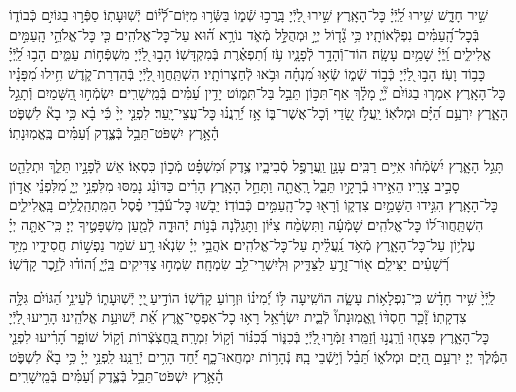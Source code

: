 \documentclass[twoside, openany, parskip=half, 11pt]{book}
\begin{document}
שִׁ֣יר חָדָ֑שׁ שִׁ֥ירוּ לַֽ֝יְֿיָ֗ כׇּל־הָאָֽרֶץ׃
שִׁ֣ירוּ לַ֭יְֿיָ בָּֽרֲכ֣וּ שְֿׁמ֑וֹ בַּשְּֿׂר֥וּ מִיּֽוֹם־לְֿ֝י֗וֹם יְֿשֽׁוּעָתֽוֹ׃
סַפְּֿר֣וּ בַגּוֹיִ֣ם כְּֿבוֹד֑וֹ בְּֿכׇל־הָֽ֝עַמִּ֗ים נִפְלְֿאוֹתָֽיו׃
כִּ֥י גָ֘ד֤וֹל יְיָ֣ וּמְהֻלָּ֣ל מְֿאֹ֑ד נוֹרָ֥א ה֝֗וּא עַל־כׇּל־אֱלֹהִֽים׃
כִּ֤י כׇּל־אֱלֹהֵ֣י הָֽעַמִּ֣ים אֱלִילִ֑ים וַֽ֝יְֿיָ֗ שָׁמַ֥יִם עָשָֽׂה׃
הוֹד־וְֿהָדָ֥ר לְֿפָנָ֑יו עֹ֥ז וְֿ֝תִפְאֶ֗רֶת בְּֿמִקְדָּשֽׁוֹ׃
הָב֣וּ לַ֭יְֿיָ מִשְׁפְּֿח֣וֹת עַמִּ֑ים הָב֥וּ לַֽ֝יְֿיָ֗ כָּב֥וֹד וָעֹֽז׃
הָב֣וּ לַ֭יְֿיָ כְּֿב֣וֹד שְֿׁמ֑וֹ שְֿׂא֥וּ מִ֝נְחָ֗ה וּבֹ֥אוּ לְֿחַצְרוֹתָֽיו׃
הִשְׁתַּֽחֲו֣וּ לַ֭יְֿיָ בְּֿהַדְרַת־קֹ֑דֶשׁ חִ֥ילוּ מִ֝פָּנָ֗יו כׇּל־הָאָֽרֶץ׃
אִמְר֤וּ בַגּוֹיִ֨ם יְ֘יָ֤ מָלָ֗ךְ אַף־תִּכּ֣וֹן תֵּבֵ֣ל בַּל־תִּמּ֑וֹט יָדִ֥ין עַ֝מִּ֗ים בְּֿמֵֽישָׁרִֽים׃
יִשְׂמְֿח֣וּ הַ֭שָּׁמַיִם וְֿתָגֵ֣ל הָאָ֑רֶץ יִרְעַ֥ם הַ֝יָּ֗ם וּמְלֹאֽוֹ׃
יַֽעֲלֹ֣ז שָׂ֭דַי וְֿכׇל־אֲשֶׁר־בּ֑וֹ אָ֥ז יְֿ֝רַֽנֲנ֗וּ כׇּל־עֲצֵי־יָֽעַר׃
לִפְנֵ֤י יְיָ֨ כִּ֬י בָ֗א כִּ֥י בָא֘ לִשְׁפֹּ֢ט הָ֫אָ֥רֶץ יִשְׁפֹּט־תֵּבֵ֥ל בְּֿצֶ֑דֶק וְֿ֝עַמִּ֗ים בֶּֽאֱמֽוּנָתֽוֹ׃

תָּגֵ֣ל הָאָ֑רֶץ יִ֝שְׂמְֿח֗וּ אִיִּ֥ים רַבִּֽים׃
עָנָ֣ן וַֽעֲרָפֶ֣ל סְֿבִיבָ֑יו צֶ֥דֶק וּ֝מִשְׁפָּ֗ט מְֿכ֣וֹן כִּסְאֽוֹ׃
אֵשׁ לְֿפָנָ֣יו תֵּלֵ֑ךְ וּתְלַהֵ֖ט סָבִ֣יב צָרָֽיו׃
הֵאִ֣ירוּ בְֿרָקָ֣יו תֵּבֵ֑ל רָֽאֲתָ֖ה וַתָּחֵ֣ל הָאָֽרֶץ׃
הָרִ֗ים כַּדּוֹנַ֗ג נָמַסּוּ מִלִּפְנֵ֣י יְיָ֑ מִ֝לִּפְנֵ֗י אֲד֣וֹן כׇּל־הָאָֽרֶץ׃
הִגִּ֣ידוּ הַשָּׁמַ֣יִם צִדְק֑וֹ וְֿרָא֖וּ כׇל־הָֽעַמִּ֣ים כְּֿבוֹדֽוֹ׃
יֵבֹ֤שׁוּ כׇּל־עֹ֬בְֿדֵי פֶ֗סֶל הַמִּֽתְהַֽלֲלִ֥ים בָּֽאֱלִילִ֑ים הִשְׁתַּֽחֲווּ־ל֝וֹ כׇּל־אֱלֹהִֽים׃
שָׁמְֿעָ֬ה וַתִּשְׂמַ֨ח צִיּ֗וֹן וַתָּגֵלְֿנָה בְּֿנ֣וֹת יְֿהוּדָ֑ה לְֿמַ֖עַן מִשְׁפָּטֶ֣יךָ יְיָ׃
כִּֽי־אַתָּ֤ה יְיָ֗ עֶלְי֥וֹן עַל־כׇּל־הָאָ֑רֶץ מְֿאֹ֥ד נַֽ֝עֲלֵ֗יתָ עַל־כׇּל־אֱלֹהִֽים׃
אֹהֲבֵ֥י יְיָ֗ שִׂנְא֫וּ רָ֥ע שֹׁמֵר נַפְשׁ֣וֹת חֲסִידָ֑יו מִיַּ֥ד רְֿ֝שָׁעִ֗ים יַצִּילֵֽם׃
א֖וֹר־זָרֻ֣עַ לַצַּדִּ֑יק וּֽלְיִשְׁרֵי־לֵ֥ב שִׂמְחָֽה׃
שִׂמְח֣וּ צַדִּיקִים בַּֽיְֿיָ֑ וְֿ֝הוֹד֗וּ לְֿזֵ֣כֶר קָדְֿשֽׁוֹ׃


לַֽיְֿיָ֙ שִׁ֥יר חָדָ֗שׁ כִּֽי־נִפְלָא֥וֹת עָשָׂ֑ה הוֹשִֽׁיעָה לּ֥וֹ יְֿ֝מִינ֗וֹ וּזְר֥וֹעַ קָדְֿשֽׁוֹ׃
הוֹדִ֣יעַ ֖יְיָ יְֿשֽׁוּעָת֑וֹ לְֿעֵינֵ֥י הַ֝גּוֹיִ֗ם גִּלָּ֥ה צִדְקָתֽוֹ׃
זָ֘כַ֤ר חַסְדּ֨וֹ וֶֽאֱמֽוּנָתוֹ֘ לְֿבֵ֢ית יִשְׂרָ֫אֵ֥ל רָא֥וּ כׇל־אַפְסֵי־אָ֑רֶץ אֵ֝֗ת יְֿשׁוּעַ֥ת אֱלֹהֵֽינוּ׃
הָרִ֣יעוּ לַ֭יְֿיָ כׇּל־הָאָ֑רֶץ פִּצְח֖וּ וְֿרַֽנֲנ֣וּ וְֿזַמֵּֽרוּ׃
זַמְּֿר֣וּ ֖לַיְֿיָ בְּֿכִנּ֑וֹר בְּֿ֝כִנּ֗וֹר וְֿק֣וֹל זִמְרָֽה׃
֖בַּֽחֲצֹֽצְֿרוֹת וְֿק֣וֹל שׁוֹפָ֑ר הָ֝רִ֗יעוּ לִפְנֵ֤י הַמֶּ֬לֶךְ יְיָ׃
יִרְעַ֣ם הַ֭יָּם וּמְלֹא֑וֹ תֵּ֝בֵ֗ל וְֿי֣שְֿׁבֵי בָֽהּ׃
נְֿהָר֥וֹת יִמְחֲאוּ־כָ֑ף יַ֝֗חַד הָרִ֥ים יְֿרַנֵּֽנוּ׃
לִֽפְנֵ֥י יְיָ֗ כִּ֥י בָא֘ לִשְׁפֹּ֢ט הָ֫אָ֥רֶץ יִשְׁפֹּט־תֵּבֵ֥ל בְּֿצֶ֑דֶק וְֿ֝עַמִּ֗ים בְּֿמֵֽישָׁרִֽים׃
\end{document}
